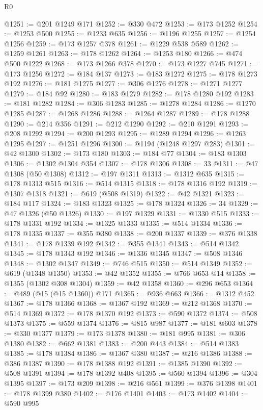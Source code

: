 \begin{lexlean}{R0}
\begin{coremodule}
@1251 := @201 @1249 @171
@1252 := @330 @472
@1253 := @173 @1252
@1254 := @1253 @500
@1255 := @1233 @635
@1256 := @1196 @1255
@1257 := @1254 @1256
@1259 := @173 @1257 @378
@1261 := @1229 @538 @589
@1262 := @1259 @1261
@1263 := @178 @1262
@1264 := @1253 @180
@1266 := @474 @500 @1222
@1268 := @173 @1266 @378
@1270 := @173 @1227 @745
@1271 := @173 @1256
@1272 := @184 @137
@1273 := @183 @1272
@1275 := @178 @1273 @192
@1276 := @181 @1275
@1277 := @306 @1276
@1278 := @1271 @1277
@1279 := @184 @92
@1280 := @183 @1279
@1282 := @178 @1280 @192
@1283 := @181 @1282
@1284 := @306 @1283
@1285 := @1278 @1284
@1286 := @1270 @1285
@1287 := @1268 @1286
@1288 := @1264 @1287
@1289 := @178 @1288
@1290 := @214 @356
@1291 := @212 @1290
@1292 := @210 @1291
@1293 := @208 @1292
@1294 := @200 @1293
@1295 := @1289 @1294
@1296 := @1263 @1295
@1297 := @1251 @1296
@1300 := @1194 (@1248 @1297 @283)
@1301 := @42 @1300
@1302 := @173 @180
@1303 := @184 @77
@1304 := @183 @1303
@1306 := @1302 @1304 @354
@1307 := @178 @1306
@1308 := 33
@1311 := @47 @1308 (@50 @1308)
@1312 := @197 @1311
@1313 := @1312 @635
@1315 := @178 @1313 @515
@1316 := @514 @1315
@1318 := @178 @1316 @192
@1319 := @1307 @1318
@1321 := @619 (@508 @1319)
@1322 := @42 @1321
@1323 := @184 @117
@1324 := @183 @1323
@1325 := @178 @1324
@1326 := 34
@1329 := @47 @1326 (@50 @1326)
@1330 := @197 @1329
@1331 := @1330 @515
@1333 := @178 @1331 @192
@1334 := @1325 @1333
@1335 := @514 @1334
@1336 := @178 @1335
@1337 := @355 @380
@1338 := @200 @1337
@1339 := @376 @1338
@1341 := @178 @1339 @192
@1342 := @355 @1341
@1343 := @514 @1342
@1345 := @178 @1343 @192
@1346 := @1336 @1345
@1347 := @508 @1346
@1348 := @1302 @1347
@1349 := @746 @515
@1350 := @514 @1349
@1352 := @619 (@1348 @1350)
@1353 := @42 @1352
@1355 := @766 @653 @14
@1358 := @1355 (@1302 @308 @1304)
@1359 := @42 @1358
@1360 := @296 @653
@1364 := @489 (@15 (@15 @1360)) @171
@1365 := @936 @663
@1366 := @1312 @452
@1367 := @178 @1366
@1368 := @1367 @192
@1369 := @212 @1368
@1370 := @514 @1369
@1372 := @178 @1370 @192
@1373 := @590 @1372
@1374 := @508 @1373
@1375 := @559 @1374
@1376 := @815 @987
@1377 := @181 @603
@1378 := @330 @1377
@1379 := @173 @1378
@1380 := @181 @995
@1381 := @306 @1380
@1382 := @662 @1381
@1383 := @200 @443
@1384 := @514 @1383
@1385 := @178 @1384
@1386 := @1367 @380
@1387 := @216 @1386
@1388 := @386 @1387
@1390 := @178 @1388 @192
@1391 := @1385 @1390
@1392 := @508 @1391
@1394 := @178 @1392 @408
@1395 := @560 @1394
@1396 := @304 @1395
@1397 := @173 @209
@1398 := @216 @561
@1399 := @376 @1398
@1401 := @178 @1399 @380
@1402 := @176 @1401
@1403 := @173 @1402
@1404 := @590 @995

\end{coremodule}
\end{lexlean}
